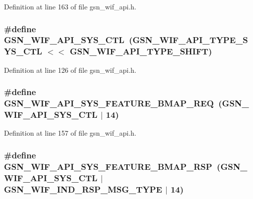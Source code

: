 Definition at line 163 of file gsn\_\-wif\_\-api.h.

\hypertarget{a00606_a681c57c3ba88deec4991fdd5717fa2cc}{
\subsubsection[{GSN\_\-WIF\_\-API\_\-SYS\_\-CTL}]{\setlength{\rightskip}{0pt plus 5cm}\#define GSN\_\-WIF\_\-API\_\-SYS\_\-CTL~(GSN\_\-WIF\_\-API\_\-TYPE\_\-SYS\_\-CTL $<$$<$ GSN\_\-WIF\_\-API\_\-TYPE\_\-SHIFT)}}
\label{a00606_a681c57c3ba88deec4991fdd5717fa2cc}


Definition at line 126 of file gsn\_\-wif\_\-api.h.

\hypertarget{a00606_a4535e602c9ce56975b1048ff27f961e2}{
\subsubsection[{GSN\_\-WIF\_\-API\_\-SYS\_\-FEATURE\_\-BMAP\_\-REQ}]{\setlength{\rightskip}{0pt plus 5cm}\#define GSN\_\-WIF\_\-API\_\-SYS\_\-FEATURE\_\-BMAP\_\-REQ~(GSN\_\-WIF\_\-API\_\-SYS\_\-CTL $|$ 14)}}
\label{a00606_a4535e602c9ce56975b1048ff27f961e2}


Definition at line 157 of file gsn\_\-wif\_\-api.h.

\hypertarget{a00606_a29c102b36af712416a8dcb56e95ddc8f}{
\subsubsection[{GSN\_\-WIF\_\-API\_\-SYS\_\-FEATURE\_\-BMAP\_\-RSP}]{\setlength{\rightskip}{0pt plus 5cm}\#define GSN\_\-WIF\_\-API\_\-SYS\_\-FEATURE\_\-BMAP\_\-RSP~(GSN\_\-WIF\_\-API\_\-SYS\_\-CTL $|$ GSN\_\-WIF\_\-IND\_\-RSP\_\-MSG\_\-TYPE $|$ 14)}}
\label{a00606_a29c102b36af712416a8dcb56e95ddc8f}


